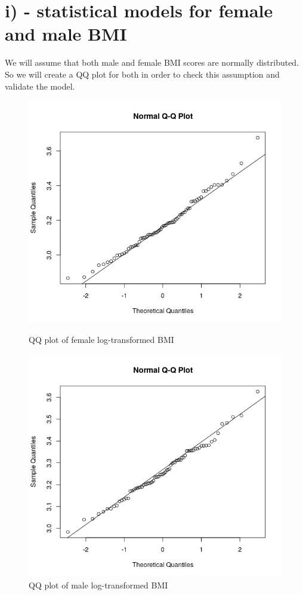 \documentclass{memoir}
\begin{document}
\section{i) - statistical models for female and male BMI}
We will assume that both male and female BMI scores are normally distributed. So we will create a QQ plot for both in order to check this assumption and validate the model. 
\begin{figure}[H]
	\centering
	\begin{minipage}{0.5\textwidth}
		\centering
		\includegraphics[width=1\textwidth]{femalelog.png}
		\caption{QQ plot of female log-transformed BMI}
	\end{minipage}\hfill
	\begin{minipage}{0.5\textwidth}
		\centering
		\includegraphics[width=1\textwidth]{malelog.png}
		\caption{QQ plot of male log-transformed BMI}
	\end{minipage}
\end{figure}
\end{document}
